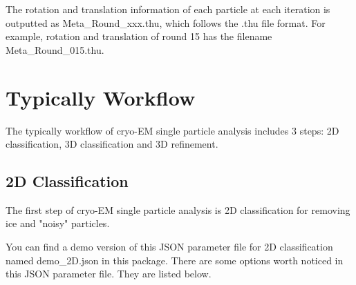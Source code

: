 \documentclass{article}
\begin{document}
        The rotation and translation information of each particle at each iteration is outputted as \textsf{Meta\_Round\_xxx.thu}, which follows the \textsf{.thu} file format. For example, rotation and translation of round 15 has the filename \textsf{Meta\_Round\_015.thu}.
        
    \section{Typically Workflow}
    
        The typically workflow of cryo-EM single particle analysis includes 3 steps: 2D classification, 3D classification and 3D refinement. 
        
        \subsection{2D Classification}
        
        The first step of cryo-EM single particle analysis is 2D classification for removing ice and "noisy" particles.
        
        You can find a demo version of this JSON parameter file for 2D classification named \textsf{demo\_2D.json} in this package. There are some options worth noticed in this JSON parameter file. They are listed below.
        
\end{document}
